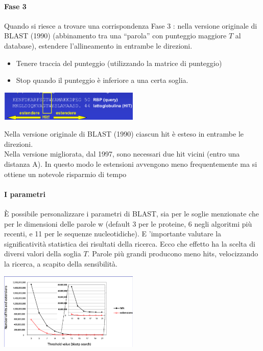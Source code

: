 \documentclass{article}
\begin{document}
\paragraph{Fase 3}Quando si riesce a trovare una corrispondenza Fase 3 : nella versione originale di BLAST (1990)
(abbinamento tra una “parola” con punteggio maggiore $T$ al database),
estendere l'allineamento in entrambe le direzioni.
\begin{itemize}
    \item Tenere traccia del punteggio (utilizzando la matrice di
    punteggio)
    \item Stop quando il punteggio è inferiore a una certa soglia.
\end{itemize}
\begin{center}
    \includegraphics[width=0.5\textwidth]{figures/fase3.png}
\end{center}
Nella versione originale di BLAST (1990) ciascun hit è esteso in entrambe le direzioni.\\
Nella versione migliorata, dal 1997, sono necessari due
hit vicini (entro una distanza A). In questo modo le
estensioni avvengono meno frequentemente ma si
ottiene un notevole risparmio di tempo
\paragraph{I parametri}
È possibile personalizzare i parametri di BLAST, sia per le soglie
menzionate che per le dimensioni delle parole w (default 3 per le
proteine, 6 negli algoritmi più recenti, e 11 per le sequenze
nucleotidiche).
E 'importante valutare la significatività statistica dei risultati
della ricerca.
Ecco che effetto ha la scelta di diversi valori della soglia $T$.
Parole più grandi
producono meno
hits, velocizzando
la ricerca, a scapito
della sensibilità.
\begin{center}
    \includegraphics[width=0.5\textwidth]{figures/param.png}
\end{center}
\end{document}
